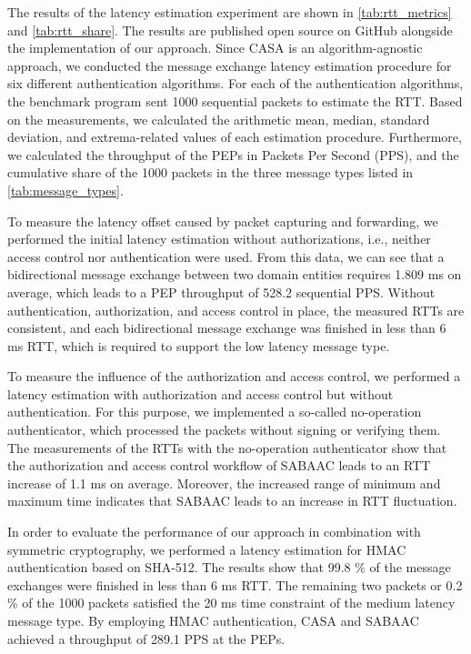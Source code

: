 The results of the latency estimation experiment are shown in \autoref{tab:rtt_metrics} and \autoref{tab:rtt_share}.
The results are published open source on GitHub \cite{gitcasc} alongside the implementation of our approach.
Since CASA is an algorithm-agnostic approach, we conducted the message exchange latency estimation procedure for six different authentication algorithms.
For each of the authentication algorithms, the benchmark program sent 1000 sequential packets to estimate the RTT.
Based on the measurements, we calculated the arithmetic mean, median, standard deviation, and extrema-related values of each estimation procedure.
Furthermore, we calculated the throughput of the PEPs in Packets Per Second (PPS), and the cumulative share of the 1000 packets in the three message types listed in \autoref{tab:message_types}.

To measure the latency offset caused by packet capturing and forwarding, we performed the initial latency estimation without authorizations, i.e., neither access control nor authentication were used.
From this data, we can see that a bidirectional message exchange between two domain entities requires 1.809 ms on average, which leads to a PEP throughput of 528.2 sequential PPS.
Without authentication, authorization, and access control in place, the measured RTTs are consistent, and each bidirectional message exchange was finished in less than 6 ms RTT, which is required to support the low latency message type.

To measure the influence of the authorization and access control, we performed a latency estimation with authorization and access control but without authentication.
For this purpose, we implemented a so-called no-operation authenticator, which processed the packets without signing or verifying them.
The measurements of the RTTs with the no-operation authenticator show that the authorization and access control workflow of SABAAC leads to an RTT increase of 1.1 ms on average.
Moreover, the increased range of minimum and maximum time indicates that SABAAC leads to an increase in RTT fluctuation.

In order to evaluate the performance of our approach in combination with symmetric cryptography, we performed a latency estimation for HMAC authentication based on SHA-512.
The results show that 99.8 \% of the message exchanges were finished in less than 6 ms RTT.
The remaining two packets or 0.2 \% of the 1000 packets satisfied the 20 ms time constraint of the medium latency message type.
By employing HMAC authentication, CASA and SABAAC achieved a throughput of 289.1 PPS at the PEPs.

